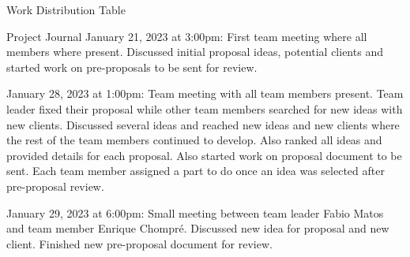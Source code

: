 Work Distribution Table

Project Journal 
January 21, 2023 at 3:00pm: First team meeting where all members where present. Discussed initial proposal ideas, potential clients and started work on pre-proposals to be sent for review.

January 28, 2023 at 1:00pm: Team meeting with all team members present. Team leader fixed their proposal while other team members searched for new ideas with new clients. Discussed several ideas and reached new ideas and new clients where the rest of the team members continued to develop. Also ranked all ideas and provided details for each proposal. Also started work on proposal document to be sent. Each team member assigned a part to do once an idea was selected after pre-proposal review. 

January 29, 2023 at 6:00pm: Small meeting between team leader Fabio Matos and team member Enrique Chompré. Discussed new idea for proposal and new client. Finished new pre-proposal document for review.

